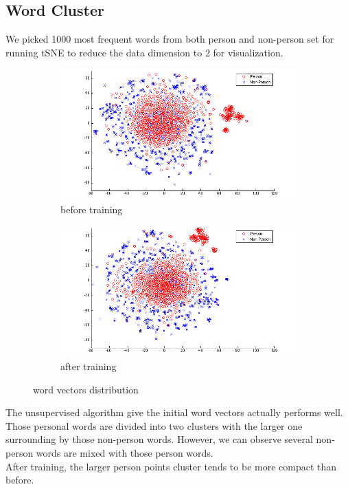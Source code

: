 \documentclass[letterpaper]{article}
\begin{document}
\subsection{Word Cluster}
We picked 1000 most frequent words from both person and non-person set for running tSNE to reduce the data dimension to 2 for visualization. \\
\begin{figure}[ht]
\centering
\begin{subfigure}{.5\textwidth}
  \centering
  \includegraphics[width=1.0\linewidth]{before.png}
  \caption{before training}
  \label{fig:vectors_before}
\end{subfigure}%
\begin{subfigure}{.5\textwidth}
  \centering
  \includegraphics[width=1.0\linewidth]{after.png}
  \caption{after training}
  \label{fig:vectors_after}
\end{subfigure}
\caption{word vectors distribution}
\label{fig:vectors}
\end{figure}
The unsupervised algorithm give the initial word vectors actually performs well. Those personal words are divided into two clusters with the larger one surrounding by those non-person words. However, we can observe several non-person words are mixed with those person words. \\
After training, the larger person points cluster tends to be more compact than before. \\
\end{document}
